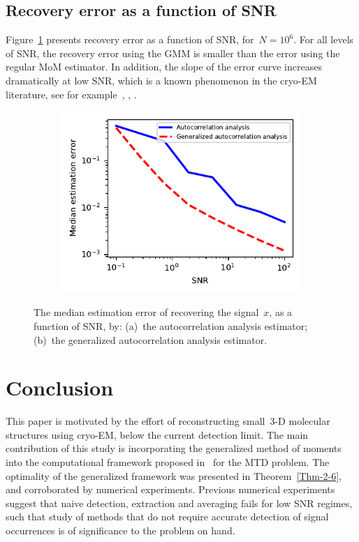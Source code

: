 \documentclass{article}
\begin{document}
\subsection{Recovery error as a function of SNR}
\label{subsec:exp_SNR}
Figure~\ref{fig:err_noise_experiment} presents recovery error as a function of SNR, for~$N = 10^6$. For all levels of SNR, the recovery error using the GMM is smaller than the error using the regular MoM estimator. In addition, the slope of the error curve increases dramatically at low SNR, which is a known phenomenon in the \mbox{cryo-EM} literature, see for example~\cite{sigworth1998maximum}, \cite{abbe2018multireference}, \cite{perry2019sample}.

\begin{figure}[!tb]
	\begin{subfigure}[ht]{\columnwidth}
		\centering
		\includegraphics[width=\columnwidth]{figures/experiment_SNR_err.pdf}
	\end{subfigure}
	\caption{The median estimation error of recovering the signal~$x$, as a function of SNR, by: (a)~the autocorrelation analysis estimator; (b)~the generalized autocorrelation analysis estimator.}
\label{fig:err_noise_experiment}
\end{figure}

\section{Conclusion}
\label{sec:conclusion}
This paper is motivated by the effort of reconstructing small~\mbox{3-D} molecular structures using \mbox{cryo-EM}, below the current detection limit. The main contribution of this study is incorporating the generalized method of moments into the computational framework proposed in~\cite{bendory2018toward} for the MTD problem. The optimality of the generalized framework was presented in Theorem~\ref{Thm-2-6}, and corroborated by numerical experiments. Previous numerical experiments~\cite{kreymer2021two} suggest that naive detection, extraction and averaging fails for low SNR regimes, such that study of methods that do not require accurate detection of signal occurrences is of significance to the problem on hand.
\end{document}
